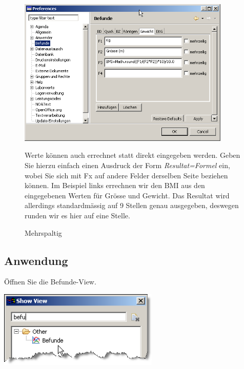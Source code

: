 \begin{figure}[htbp]
   \begin{minipage}{0.35\textwidth}
       \centering
    \includegraphics[width=0.9\textwidth]{images/befunde7.png}
    \caption{Mehrspaltig}\label{fig:befunde4}
       \label{fig:befunde4}
     \end{minipage}\hfill
     \begin{minipage}{0.65\textwidth}
Werte können auch errechnet statt direkt eingegeben werden. Geben Sie hierzu einfach einen Ausdruck der Form \textit{Resultat=Formel} ein, wobei Sie sich mit Fx auf andere Felder derselben Seite beziehen können. Im Beispiel links errechnen wir den BMI aus den eingegebenen Werten für Grösse und Gewicht. Das Resultat wird allerdings standardmässig auf 9 Stellen genau ausgegeben, deswegen runden wir es hier auf eine Stelle.
    \end{minipage}
\end{figure}

\clearpage

\subsection{Anwendung}
Öffnen Sie die  Befunde-View.
\begin{flushleft}
\includegraphics[width=3in]{images/befunde4.png}
\end{flushleft}

